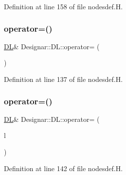 Definition at line 158 of file nodesdef.\+H.

\mbox{\label{class_designar_1_1_d_l_a7eb7d13fee4174fa5f4166722316530d}} 
\subsubsection{\texorpdfstring{operator=()}{operator=()}\hspace{0.1cm}{\footnotesize\ttfamily [1/2]}}
{\footnotesize\ttfamily \hyperlink{class_designar_1_1_d_l}{DL}\& Designar\+::\+D\+L\+::operator= (\begin{DoxyParamCaption}\item[{const \hyperlink{class_designar_1_1_d_l}{DL} \&}]{ }\end{DoxyParamCaption})\hspace{0.3cm}{\ttfamily [inline]}}



Definition at line 137 of file nodesdef.\+H.

\mbox{\label{class_designar_1_1_d_l_adc892f364736bab874a6a739e88b5c60}} 
\subsubsection{\texorpdfstring{operator=()}{operator=()}\hspace{0.1cm}{\footnotesize\ttfamily [2/2]}}
{\footnotesize\ttfamily \hyperlink{class_designar_1_1_d_l}{DL}\& Designar\+::\+D\+L\+::operator= (\begin{DoxyParamCaption}\item[{\hyperlink{class_designar_1_1_d_l}{DL} \&\&}]{l }\end{DoxyParamCaption})\hspace{0.3cm}{\ttfamily [inline]}}



Definition at line 142 of file nodesdef.\+H.

\mbox{\label{class_designar_1_1_d_l_a005d23127d2743fec552cafce79095d4}} 
